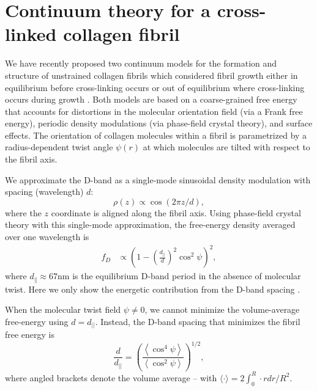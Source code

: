 \documentclass[preprint,12pt]{elsarticle}
\begin{document}
\section{Continuum theory for a cross-linked collagen fibril}
\label{sec:theory}
We have recently proposed two continuum models for the formation and structure of unstrained collagen fibrils which considered fibril growth either in equilibrium before cross-linking occurs \cite{Cameron:2020} or out of equilibrium where cross-linking occurs during growth \cite{Leighton:2021}. Both models are based on a coarse-grained free energy that accounts for distortions in the molecular orientation field (via a Frank free energy), periodic density modulations (via phase-field crystal theory), and surface effects. The orientation of collagen molecules within a fibril is parametrized by a radius-dependent twist angle $\psi(r)$ at which molecules are tilted with respect to the fibril axis.

We approximate the D-band as a single-mode sinusoidal density modulation with spacing (wavelength) $d$:
\begin{equation}
\rho(z)  \propto \cos(2 \pi z/d),
\end{equation}
where the $z$ coordinate is aligned along the fibril axis.
Using phase-field crystal theory with this single-mode approximation, the free-energy density averaged over one wavelength is \cite{Cameron:2020, Leighton:2021}
\begin{equation}
\begin{aligned}
f_D & \propto \left(1 - \left( \frac{d_{||}}{d} \right)^2 \cos^2\psi\right)^2,
\end{aligned} \label{dband}
\end{equation}
where $d_\parallel \approx 67\mathrm{nm}$ is the equilibrium D-band period in the absence of molecular twist. Here we only show the energetic contribution from the D-band spacing \cite{Cameron:2020, Leighton:2021}.

When the molecular twist field $\psi \neq 0$, we cannot minimize the volume-average free-energy using  $d=d_{||}$.  Instead, the D-band spacing that  minimizes the fibril free energy is \cite{Leighton:2021}
\begin{equation}\label{DBandPeriod}
\frac{d}{d_{||}} = \left( \frac{\left\langle \cos^4\psi\right\rangle}{\left\langle \cos^2\psi\right\rangle}\right)^{1/2},
\end{equation}
where angled brackets denote the volume average -- with $\langle \cdot\rangle = 2 \int_0^R \cdot r dr /R^2$. 
\end{document}
